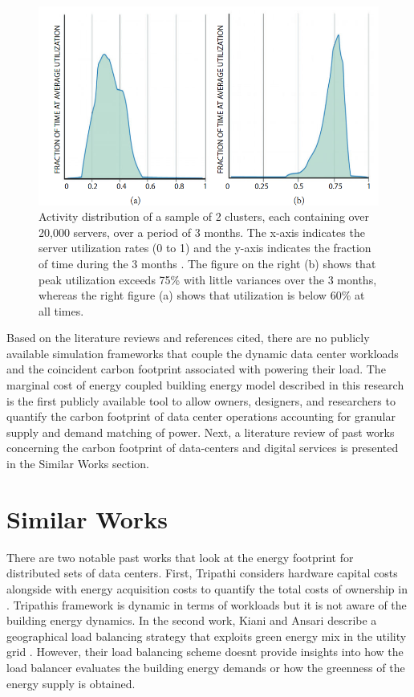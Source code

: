   \begin{figure}
    \centering
    \includegraphics[scale=.2]{marginal_energy_cost/img/google_activity_dist.png}
    \caption[Usage profiles of two production DC Clusters]{Activity distribution of a sample of 2 clusters, each containing over 20,000 servers, over a period of 3 months. The x-axis indicates the server utilization rates (0 to 1) and the y-axis indicates the fraction of time during the 3 months \citep{barroso18}. The figure on the right (b) shows that peak utilization exceeds 75\% with little variances over the 3 months, whereas the right figure (a) shows that utilization is below 60\% at all times.}
    \label{fig:google_activity_dist}
    \end{figure}

Based on the literature reviews and references cited, there are no publicly available simulation frameworks that couple the dynamic data center workloads and the coincident carbon footprint associated with powering their load. The marginal cost of energy coupled building energy model described in this research is the first publicly available tool to allow owners, designers, and researchers to quantify the carbon footprint of data center operations accounting for granular supply and demand matching of power. Next, a literature review of past works concerning the carbon footprint of data-centers and digital services is presented in the Similar Works section.


\section{Similar Works}
There are two notable past works that look at the energy footprint for distributed sets of data centers. First, Tripathi considers hardware capital costs alongside with energy acquisition costs to quantify the total costs of ownership in \citep{tripathi17}. Tripathi\textsc{}s framework is dynamic in terms of workloads but it is not aware of the building energy dynamics. In the second work, Kiani and Ansari describe a geographical load balancing strategy that exploits green energy mix in the utility grid \citep{kiani17}. However, their load balancing scheme doesn\textsc{}t provide insights into how the load balancer evaluates the building energy demands or how the greenness of the energy supply is obtained. 

